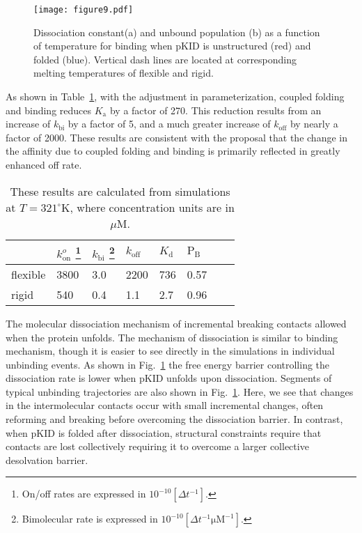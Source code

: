 \documentclass[../talant.diss.submit.tex]{subfiles}
\begin{document}
\begin{figure}[h!]
  \centering
  \texttt{[image: figure9.pdf]}
  \caption{Dissociation constant(a) and unbound population (b) as a function of
    temperature for binding when pKID is unstructured (red) and folded (blue).
    Vertical dash lines are located at corresponding melting temperatures of
    flexible and rigid.}
  \label{fig:figure10}
\end{figure}

As shown in Table~\ref{tab:affinity_kinetics}, with the adjustment in
parameterization, coupled folding and binding reduces $K_\mathrm{a}$ by a factor
of 270. This reduction results from an increase of $k_\mathrm{bi}$ by a factor
of 5, and a much greater increase of $k_\mathrm{off}$ by nearly a factor of
2000.  These results are consistent with the proposal that the change in the
affinity due to coupled folding and binding is primarily reflected in greatly
enhanced off rate.\cite{zhou:12}


\begin{table}[t!]
  \centering
  \begin{tabular}{@{}llllllll@{}}
    & $k_{\mathrm{on}}^{o}$ \footnote{On/off rates are expressed in $10^{-10} [\Delta t^{-1}]$.}
    & $k_{\mathrm{bi}}$  \footnote{Bimolecular rate is expressed in $10^{-10} [\Delta t^{-1}\mathrm{\mu M^{-1}}]$.}
    & $k_{\mathrm{off}}$
    & $K_{\mathrm{d}}$
    & $\mathrm{P_{B}}$ \\
    \hline
    flexible  &  3800  & 3.0  & 2200  & 736   &  0.57  \\%
    rigid     &  540   & 0.4  & 1.1   & 2.7   &  0.96  \\%
  \end{tabular}
  \caption{ These results are calculated from simulations at $T=321 ^\circ$K, where
    concentration units are in $\mu \mathrm{M}$. }
  \label{tab:affinity_kinetics}
\end{table}


The molecular dissociation mechanism of incremental breaking contacts allowed when
the protein unfolds. The mechanism of dissociation is similar to binding
mechanism, though it is easier to see directly in the simulations in individual
unbinding events.
As shown in Fig.~\ref{fig:figure10} the free
energy barrier controlling the dissociation rate is lower when pKID unfolds upon
dissociation. Segments of typical unbinding trajectories are also shown in
Fig.~\ref{fig:figure10}. Here, we see that changes in the intermolecular
contacts occur with small incremental changes, often reforming and breaking
before overcoming the dissociation barrier. In contrast, when pKID is folded
after dissociation, structural constraints require that contacts are lost
collectively requiring it to overcome a larger collective desolvation barrier.
\end{document}
